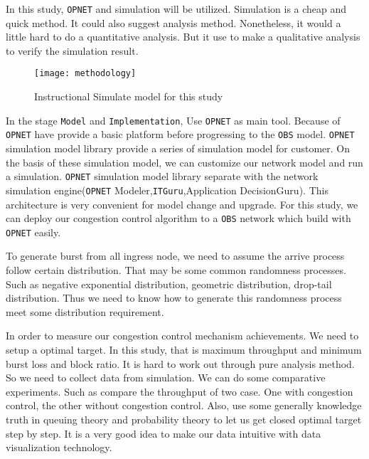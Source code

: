 \newpage
In this study, \verb|OPNET| and simulation will be utilized. Simulation is a cheap and quick method. It could also suggest analysis method. Nonetheless, it would a little hard to do a quantitative analysis. But it use to make a qualitative analysis to verify the simulation result.

\begin{figure}[!htb]
    \label{fig:methodology}
    \begin{center}
        \leavevmode
        \ifpdf
        \else
        \texttt{[image: methodology]}
        \fi
        \caption{Instructional Simulate model for this study}
    \end{center}
\end{figure}

In the stage \verb|Model| and \verb|Implementation|, Use \verb|OPNET| as main tool. Because of \verb|OPNET| have provide a basic platform before progressing to the \verb|OBS| model. \verb|OPNET| simulation model library provide a series of simulation model for customer. On the basis of these simulation model, we can customize our network model and run a simulation. \verb|OPNET| simulation model library separate with the network simulation engine(\verb|OPNET|
Modeler,\verb|ITGuru|,Application DecisionGuru). This architecture is very convenient for model change and upgrade. For this study, we can deploy our congestion control algorithm to a \verb|OBS| network which build with \verb|OPNET| easily. 

To generate burst from all ingress node, we need to assume the arrive process follow certain distribution. That may be some common randomness processes. Such as negative exponential distribution, geometric distribution, drop-tail distribution. Thus we need to know how to generate this randomness process meet some distribution requirement. 

In order to measure our congestion control mechanism achievements. We need to setup a optimal target. In this study, that is maximum throughput and minimum burst loss and block ratio. It is hard to work out through pure analysis method. So we need to collect data from simulation. We can do some comparative experiments. Such as compare the throughput of two case. One with congestion control, the other without congestion control. Also, 
use some generally knowledge truth in queuing theory and probability theory to let us get closed optimal target step by step. It is a very good idea to make our data intuitive with data visualization technology.
